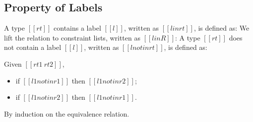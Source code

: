 \subsection{Property of Labels}

\begin{definition}
  A type $[[rt]]$ contains a label $[[l]]$,
  written as $[[l in rt]]$, is defined as:
  We lift the relation to constraint lists, written as $[[l in R]]$:
  A type $[[rt]]$ does not contain a label $[[l]]$,
  written as $[[l notin rt]]$, is defined as:
\end{definition}

\begin{lemma} \leavevmode
  \label{lemma:lnt-eq}
  Given $[[ rt1 ~ rt2 ]]$,
  \begin{itemize}
  \item if $[[l1 notin r1]]$ then $[[l1 notin r2]]$;
  \item if $[[l1 notin r2]]$ then $[[l1 notin r1]]$.
  \end{itemize}
\end{lemma}
\proof By induction on the equivalence relation.
